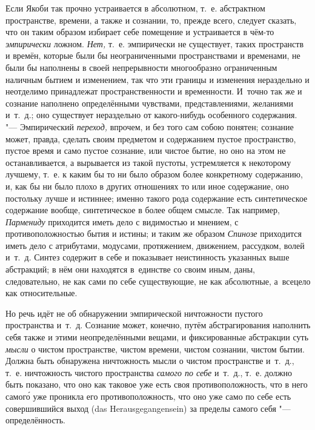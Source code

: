 Если Якоби так прочно устраивается в абсолютном, т.~е. абстрактном
пространстве, времени, а также и сознании, то, прежде всего, следует сказать,
что он таким образом избирает себе помещение и устраивается в чём-то
{\em эмпирически} ложном. {\em Нет,} т.~е. эмпирически не существует, таких
пространств и времён, которые были бы неограниченными пространствами и
временами, не были бы наполнены в своей непрерывности многообразно ограниченным
наличным бытием и изменением, так что эти границы и изменения нераздельно и
неотделимо принадлежат пространственности и временности. И~точно так же и
сознание наполнено определёнными чувствами, представлениями, желаниями и~т.~д.;
оно существует нераздельно от какого-нибудь особенного содержания. "---
Эмпирический {\em переход,} впрочем, и без того сам собою понятен; сознание
может, правда, сделать своим предметом и содержанием пустое пространство,
пустое время и само пустое сознание, или чистое бытие, но оно на этом не
останавливается, а вырывается из такой пустоты, устремляется к некоторому
лучшему, т.~е. к каким бы то ни было образом более конкретному содержанию, и,
как бы ни было плохо в других отношениях то или иное содержание, оно постольку
лучше и истиннее; именно такого рода содержание есть синтетическое содержание
вообще, синтетическое в более общем смысле. Так например, {\em Пармениду}
приходится иметь дело с видимостью и мнением, с противоположностью бытия и
истины; и таким же образом {\em Спинозе} приходится иметь дело с атрибутами,
модусами, протяжением, движением, рассудком, волей и~т.~д. Синтез содержит в
себе и показывает неистинность указанных выше абстракций; в нём они находятся
в~единстве со своим иным, даны, следовательно, не как сами по себе
существующие, не как абсолютные, а~всецело как относительные.

Но речь идёт не об обнаружении эмпирической ничтожности пустого пространства
и~т.~д. Сознание может, конечно, путём абстрагирования наполнить себя также и
этими неопределёнными вещами, и фиксированные абстракции суть {\em мысли} о чистом
пространстве, чистом времени, чистом сознании, чистом бытии. Должна быть
обнаружена ничтожность мысли о чистом пространстве и~т.~д., т.~е. ничтожность чистого
пространства {\em самого по себе} и~т.~д., т.~е. должно быть показано,
что оно как таковое уже есть своя противоположность, что в него самог\'{о}
уже проникла его противоположность, что оно уже само по себе есть совершившийся
выход (das Heraus\-ge\-gan\-gen\-sein) за пределы самого себя "--- определённость.

